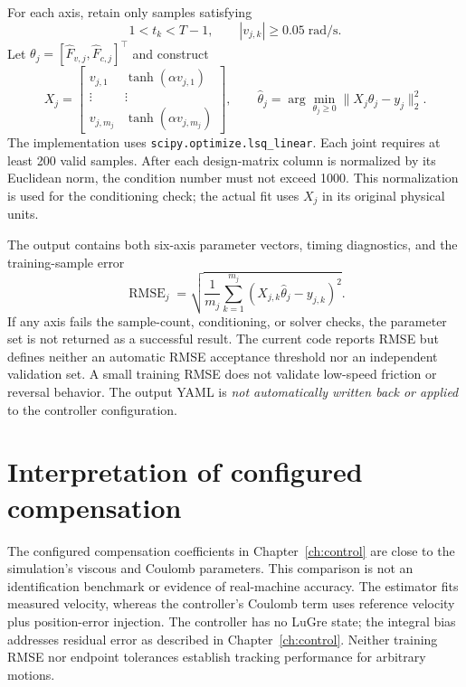 \documentclass[11pt,a4paper]{report}
\begin{document}
For each axis, retain only samples satisfying
\begin{equation}
 1<t_k<T-1,\qquad |v_{j,k}|\ge0.05\;\mathrm{rad/s}.
\end{equation}
Let $\theta_j=[\widehat F_{v,j},\widehat F_{c,j}]^\top$ and construct
\begin{equation}
 X_j=\begin{bmatrix}
 v_{j,1}&\tanh(\alpha v_{j,1})\\
 \vdots&\vdots\\
 v_{j,m_j}&\tanh(\alpha v_{j,m_j})
 \end{bmatrix},\qquad
 \widehat\theta_j=\arg\min_{\theta_j\ge0}\|X_j\theta_j-y_j\|_2^2.
 \label{eq:ls}
\end{equation}
The implementation uses \texttt{scipy.optimize.lsq\_linear}. Each joint requires at least 200 valid samples. After each design-matrix column is normalized by its Euclidean norm, the condition number must not exceed 1000. This normalization is used for the conditioning check; the actual fit uses $X_j$ in its original physical units.

The output contains both six-axis parameter vectors, timing diagnostics, and the training-sample error
\begin{equation}
 \operatorname{RMSE}_j=\sqrt{\frac1{m_j}
 \sum_{k=1}^{m_j}(X_{j,k}\widehat\theta_j-y_{j,k})^2}.
\end{equation}
If any axis fails the sample-count, conditioning, or solver checks, the parameter set is not returned as a successful result. The current code reports RMSE but defines neither an automatic RMSE acceptance threshold nor an independent validation set. A small training RMSE does not validate low-speed friction or reversal behavior. The output YAML is \emph{not automatically written back or applied} to the controller configuration.

\section{Interpretation of configured compensation}
The configured compensation coefficients in Chapter~\ref{ch:control} are
close to the simulation's viscous and Coulomb parameters. This comparison
is not an identification benchmark or evidence of real-machine accuracy.
The estimator fits measured velocity, whereas the controller's Coulomb
term uses reference velocity plus position-error injection. The controller
has no LuGre state; the integral bias addresses residual error as described
in Chapter~\ref{ch:control}. Neither training RMSE nor endpoint tolerances
establish tracking performance for arbitrary motions.
\end{document}
